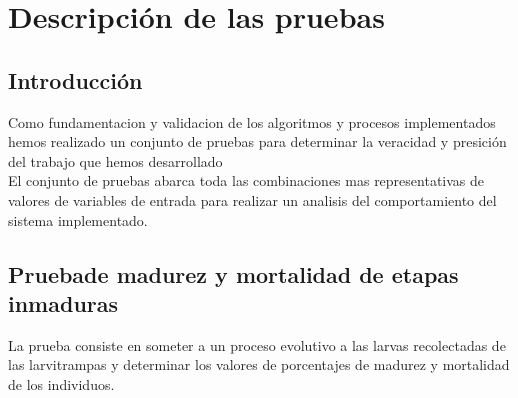 \section{ Descripción de las pruebas}

\subsection{Introducción}

Como fundamentacion y validacion de los algoritmos y procesos implementados
hemos realizado un conjunto de pruebas para determinar la veracidad y presición del 
trabajo que hemos desarrollado\\

El conjunto de pruebas abarca toda las combinaciones mas representativas
de valores de variables de entrada para realizar un analisis del comportamiento 
del sistema implementado.\\

\subsection{Pruebade madurez y mortalidad de etapas inmaduras}

La prueba consiste en someter a un proceso evolutivo a las larvas 
recolectadas de las larvitrampas y determinar los valores de porcentajes 
de madurez y mortalidad de los individuos.\\

